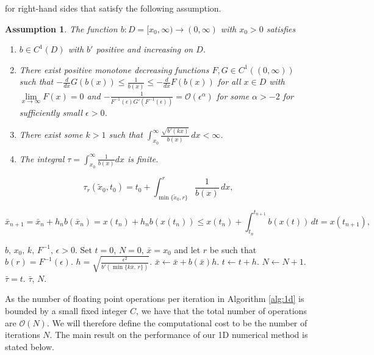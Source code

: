 \documentclass[10pt,a4paper]{amsart}
\newtheorem{assumption}{Assumption}
\renewcommand{\theassumption}{\Alph{assumption}}
\begin{document}
for right-hand sides that satisfy the following assumption. 
\begin{assumption}
The function \(b:D = [x_0, \infty) \to (0,\infty)\) with \(x_0>0\) satisfies
\begin{enumerate}[label=\arabic*), ref=\theassumption.\arabic*]
    \label{asmp:b}
    \item \(b \in C^1(D)\) with \(b'\) positive and increasing on \(D\). \label{asmp:b.C1_bDerPos}
    \item There exist positive monotone decreasing functions \(F, G\in C^1((0,\infty))\) such that \(-\frac{d}{dx}G(b(x)) \leq\frac{1}{b(x)} \leq -\frac{d}{dx}F(b(x))\) for all \(x\in D\) with 
    \mbox{\(\underset{x\to\infty}{\lim}F(x)=0\)} and \(-\frac{1}{F^{-1}(\epsilon)G'(F^{-1}(\epsilon))}=\mathcal{O}(\epsilon^{\alpha})\) for some \(\alpha>-2\) for sufficiently small \(\epsilon>0\). \label{asmp:b.FandG}
    \item There exist some \(k>1\) such that \(\int_{x_0}^\infty\frac{\sqrt{b'(kx)}}{b(x)} \, dx <\infty\). \label{asmp:b.integrabilityCond}
    \item The integral \(\tau = \int_{x_0}^\infty \frac{1}{b(x)}dx\) is finite. \label{asmp:b.tauFinite}
\end{enumerate}
\end{assumption}

\begin{equation}\label{eq:tau_1D}
\tau_r(\tilde x_0, t_0) = t_0 + \int_{\min\{\tilde x_0, r\}}^r\frac{1}{b(x)}\,dx,
\end{equation}

\begin{equation}
\label{eq:xBarBndX}
    \bar{x}_{n+1} = \bar x_n + h_nb(\bar x_n) = x(t_n) + h_nb(x(t_n)) \leq x(t_n) + \int_{t_n}^{t_{n+1}}b(x(t))\,dt = x(t_{n+1}),
\end{equation}

\begin{algorithm}
    \caption{Estimating blow-up time of 1D ODE}
    \label{alg:1d}
    \begin{algorithmic}[1]
        \Require \(b,\, x_0,\, k,\, F^{-1},\,\epsilon > 0\).
        \State Set \(t = 0,\, N=0,\,\bar x = x_0\) and let \(r\) be such that \(b(r) = F^{-1}(\epsilon)\).
            \State \(h = \sqrt{\frac{\epsilon^2}{b'(\min\{k\bar x,\,r\})}}\).
            \State \(\bar x \leftarrow \bar x + b(\bar x)h\).
            \State \(t \leftarrow t + h\).
            \State \(N \leftarrow N+1\).
        \EndWhile
        \State \(\bar\tau = t\).
        \Ensure \(\bar\tau,\,N\).
    \end{algorithmic}
\end{algorithm}
As the number of floating point operations per iteration in Algorithm \ref{alg:1d} is bounded by a small fixed integer \(C\), we have that the total number of operations are \(\mathcal{O}(N)\). We will therefore define the computational cost to be the number of iterations \(N\).
The main result on the performance of our 1D numerical method is stated below. 
\end{document}

